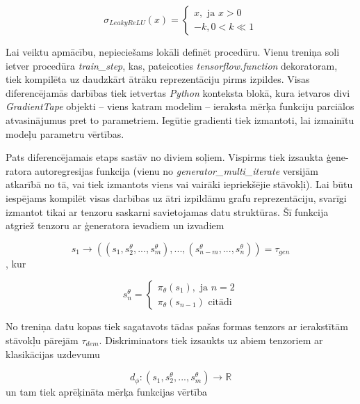 \documentclass[12pt, a4paper]{article}
\numberwithin{equation}{section} %
\begin{document}
\begin{equation}
    \sigma_{LeakyReLU}(x) = 
    \begin{cases}
        x, \text{ ja } x > 0 \\
        -k, 0 < k \ll 1
    \end{cases}
\end{equation}

Lai veiktu apmācību, nepieciešams lokāli definēt procedūru. Vienu treniņa soli ietver procedūra \textit{train\_step}, kas, pateicoties \textit{tensorflow.function} dekoratoram, tiek kompilēta uz daudzkārt ātrāku reprezentāciju pirms izpildes. Visas diferencējamās darbības tiek ietvertas \textit{Python} konteksta blokā, kura ietvaros divi \textit{GradientTape} objekti -- viens katram modelim -- ieraksta mērķa funkciju parciālos atvasinājumus pret to parametriem. Iegūtie gradienti tiek izmantoti, lai izmainītu modeļu parametru vērtības.

Pats diferencējamais etaps sastāv no diviem soļiem. Vispirms tiek izsaukta ģene-ratora autoregresijas funkcija (vienu no \textit{generator\_multi\_iterate} versijām atkarībā no tā, vai tiek izmantots viens vai vairāki iepriekšējie stāvokļi). Lai būtu iespējams kompilēt visas darbības uz ātri izpildāmu grafu reprezentāciju, svarīgi izmantot tikai ar tenzoru saskarni savietojamas datu struktūras. Šī funkcija atgriež tenzoru ar ģeneratora ievadiem un izvadiem

\begin{equation}
    s_1 \rightarrow \left ( (s_1, s^{\theta}_2 , ..., s^{\theta}_m), ...,  (s^{\theta}_{n-m}, ..., s^{\theta}_{n}) \right ) = \tau_{gen}
\end{equation}
, kur

\begin{equation}
    s^{\theta}_n = 
    \begin{cases}
        \pi_{\theta}(s_1), \text{ ja } n = 2 \\
        \pi_{\theta}(s_{n-1}) \text{ citādi}
    \end{cases}
\end{equation}


No treniņa datu kopas tiek sagatavots tādas pašas formas tenzors ar ierakstītām stāvokļu pārejām $\tau_{dem}$. Diskriminators tiek izsaukts uz abiem tenzoriem ar klasikācijas uzdevumu

\begin{equation}
    d_{\phi}: (s_1, s^{\theta}_2 , ..., s^{\theta}_m) \rightarrow \mathbb{R}
\end{equation}
un tam tiek aprēķināta mērķa funkcijas vērtība 
\end{document}
